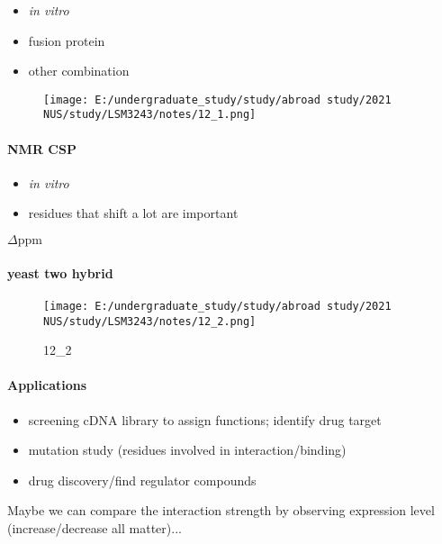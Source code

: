 \documentclass[]{article}
\let\oldparagraph\paragraph
\renewcommand{\paragraph}[1]{\oldparagraph{#1}\mbox{}}
\begin{document}
\begin{itemize}
\item
  \emph{in vitro}
\item
  fusion protein
\item
  other combination
\end{itemize}

\begin{figure}
\centering
\texttt{[image: E:/undergraduate\_study/study/abroad study/2021 NUS/study/LSM3243/notes/12\_1.png]}
\caption{}
\end{figure}

\hypertarget{nmr-csp}{%
\paragraph{NMR CSP}\label{nmr-csp}}

\begin{itemize}
\item
  \emph{in vitro}
\item
  residues that shift a lot are important
\end{itemize}

\(\Delta \mathrm{ppm}\)

\hypertarget{yeast-two-hybrid}{%
\paragraph{yeast two hybrid}\label{yeast-two-hybrid}}

\begin{figure}
\centering
\texttt{[image: E:/undergraduate\_study/study/abroad study/2021 NUS/study/LSM3243/notes/12\_2.png]}
\caption{12\_2}
\end{figure}

\hypertarget{applications-3}{%
\paragraph{Applications}\label{applications-3}}

\begin{itemize}
\item
  screening cDNA library to assign functions; identify drug target
\item
  mutation study (residues involved in interaction/binding)
\item
  drug discovery/find regulator compounds
\end{itemize}

Maybe we can compare the interaction strength by observing expression
level (increase/decrease all matter)...
\end{document}
